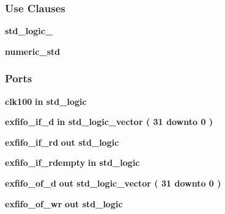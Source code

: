 \subsubsection*{Use Clauses}
 \begin{DoxyCompactItemize}
\item 
{\bf std\+\_\+logic\+\_}   
\item 
{\bf numeric\+\_\+std}   
\end{DoxyCompactItemize}
\subsubsection*{Ports}
 \begin{DoxyCompactItemize}
\item 
{\bf clk100}  {\bfseries {\bfseries \textcolor{keywordflow}{in}\textcolor{vhdlchar}{ }}} {\bfseries \textcolor{comment}{std\+\_\+logic}\textcolor{vhdlchar}{ }} 
\item 
{\bf exfifo\+\_\+if\+\_\+d}  {\bfseries {\bfseries \textcolor{keywordflow}{in}\textcolor{vhdlchar}{ }}} {\bfseries \textcolor{comment}{std\+\_\+logic\+\_\+vector}\textcolor{vhdlchar}{ }\textcolor{vhdlchar}{(}\textcolor{vhdlchar}{ }\textcolor{vhdlchar}{ } \textcolor{vhdldigit}{31} \textcolor{vhdlchar}{ }\textcolor{keywordflow}{downto}\textcolor{vhdlchar}{ }\textcolor{vhdlchar}{ } \textcolor{vhdldigit}{0} \textcolor{vhdlchar}{ }\textcolor{vhdlchar}{)}\textcolor{vhdlchar}{ }} 
\item 
{\bf exfifo\+\_\+if\+\_\+rd}  {\bfseries {\bfseries \textcolor{keywordflow}{out}\textcolor{vhdlchar}{ }}} {\bfseries \textcolor{comment}{std\+\_\+logic}\textcolor{vhdlchar}{ }} 
\item 
{\bf exfifo\+\_\+if\+\_\+rdempty}  {\bfseries {\bfseries \textcolor{keywordflow}{in}\textcolor{vhdlchar}{ }}} {\bfseries \textcolor{comment}{std\+\_\+logic}\textcolor{vhdlchar}{ }} 
\item 
{\bf exfifo\+\_\+of\+\_\+d}  {\bfseries {\bfseries \textcolor{keywordflow}{out}\textcolor{vhdlchar}{ }}} {\bfseries \textcolor{comment}{std\+\_\+logic\+\_\+vector}\textcolor{vhdlchar}{ }\textcolor{vhdlchar}{(}\textcolor{vhdlchar}{ }\textcolor{vhdlchar}{ } \textcolor{vhdldigit}{31} \textcolor{vhdlchar}{ }\textcolor{keywordflow}{downto}\textcolor{vhdlchar}{ }\textcolor{vhdlchar}{ } \textcolor{vhdldigit}{0} \textcolor{vhdlchar}{ }\textcolor{vhdlchar}{)}\textcolor{vhdlchar}{ }} 
\item 
{\bf exfifo\+\_\+of\+\_\+wr}  {\bfseries {\bfseries \textcolor{keywordflow}{out}\textcolor{vhdlchar}{ }}} {\bfseries \textcolor{comment}{std\+\_\+logic}\textcolor{vhdlchar}{ }} 

\end{DoxyCompactItemize}
